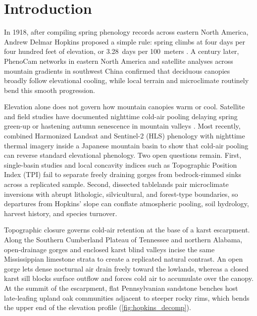 \section{Introduction}
\label{sec:intro}

In 1918, after compiling spring phenology records across eastern North America, Andrew Delmar Hopkins proposed a simple rule: spring climbs at four days per four hundred feet of elevation, or 3.28~days per 100~meters \citep{hopkins1918}. A century later, PhenoCam networks in eastern North America \citep{richardson2019} and satellite analyses across mountain gradients in southwest China \citep{jiang2022} confirmed that deciduous canopies broadly follow elevational cooling, while local terrain and microclimate routinely bend this smooth progression.

Elevation alone does not govern how mountain canopies warm or cool. Satellite and field studies have documented nighttime cold-air pooling delaying spring green-up or hastening autumn senescence in mountain valleys \citep{fisher2006, elmore2012, ward2018, pastore2024}. Most recently, \citet{mizuno2026} combined Harmonized Landsat and Sentinel-2 (HLS) phenology with nighttime thermal imagery inside a Japanese mountain basin to show that cold-air pooling can reverse standard elevational phenology. Two open questions remain. First, single-basin studies and local concavity indices such as Topographic Position Index (TPI) fail to separate freely draining gorges from bedrock-rimmed sinks across a replicated sample. Second, dissected tablelands pair microclimate inversions with abrupt lithologic, silvicultural, and forest-type boundaries, so departures from Hopkins' slope can conflate atmospheric pooling, soil hydrology, harvest history, and species turnover.

Topographic closure governs cold-air retention at the base of a karst escarpment. Along the Southern Cumberland Plateau of Tennessee and northern Alabama, open-drainage gorges and enclosed karst blind valleys incise the same Mississippian limestone strata to create a replicated natural contrast. An open gorge lets dense nocturnal air drain freely toward the lowlands, whereas a closed karst sill blocks surface outflow and forces cold air to accumulate over the canopy. At the summit of the escarpment, flat Pennsylvanian sandstone benches host late-leafing upland oak communities adjacent to steeper rocky rims, which bends the upper end of the elevation profile (\cref{fig:hopkins_decomp}).

